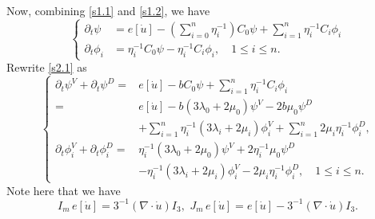 \documentclass[a4paper,12pt]{article}
\newtheorem{a priori condition}[Th]{A priori condition}
\def\dvg{\mbox{\rm div}}
\begin{document}
Now, combining \eqref{s1.1} and \eqref{s1.2}, we have
\begin{equation}\label{s2.1}
\left\{
\begin{aligned}
\partial_t\psi&=e[\dot{u}]-(\sum_{i=0}^n\eta_i^{-1})C_0\psi+\sum_{i=1}^n\eta_i^{-1}C_i\phi_i\\
\partial_t\phi_i&=\eta_i^{-1}C_0\psi-\eta_i^{-1}C_i\phi_i, \quad 1\leq i\leq n.
\end{aligned}
\right.
\end{equation}
Rewrite \eqref{s2.1} as
\begin{equation}\label{s2.4}
\left\{
\begin{aligned}
\partial_t\psi^V+\partial_t\psi^D=&e[\dot{u}]-bC_0\psi+\sum_{i=1}^n\eta_i^{-1}C_i\phi_i\\
=&e[\dot{u}]-b(3\lambda_0+2\mu_0)\psi^V-2b\mu_0\psi^D\\
&+\sum_{i=1}^n\eta_i^{-1}(3\lambda_i+2\mu_i)\phi_i^V+\sum_{i=1}^n2\mu_i\eta_i^{-1}\phi_i^D,\\
\partial_t\phi_i^V+\partial_t\phi_i^D=&\eta_i^{-1}(3\lambda_0+2\mu_0)\psi^V+2\eta_i^{-1}\mu_0\psi^D\\
&-\eta_i^{-1}(3\lambda_i+2\mu_i)\phi_i^V-2\mu_i\eta_i^{-1}\phi_i^D, \quad 1\leq i\leq n.
\end{aligned}
\right.
\end{equation}
Note here that we have
\begin{equation}\label{I_J e}
I_m\,e[\dot u]=3^{-1}(\nabla\cdot \dot u)I_3,\,\, J_m\,e[\dot u]=e[\dot u]-3^{-1}(\nabla\cdot \dot u)I_3.
\end{equation}

\end{document}
